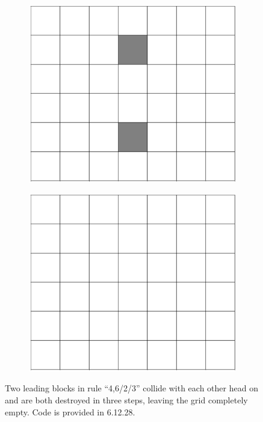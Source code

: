 \documentclass[12pt]{article}
\numberwithin{figure}{section} %
\begin{document}
\begin{figure}[H]
     	\begin{subfigure}{0.23\textwidth}
     	\centering
     	\includegraphics[width=\linewidth]{Section4/31.2}
     	\subcaption{}
   	\end{subfigure}
        	\begin{subfigure}{0.23\textwidth}
     	\centering
     	\includegraphics[width=\linewidth]{Section4/31.3}
     	\subcaption{}
   	\end{subfigure}
   \caption{Two leading blocks in rule “4,6/2/3” collide with each other head on and are both destroyed in three steps, leaving the grid completely empty. Code is provided in 6.12.28. }
\end{figure}
\end{document}
